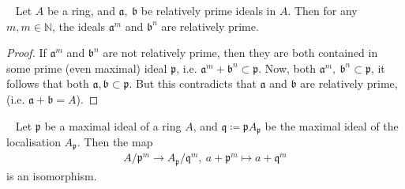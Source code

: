 \documentclass[12pt,a4paper,footinclude=true,headinclude=true]{scrbook} %
\newenvironment{lemma}[2][]
{\renewcommand\theinnercustomlemma{#2}\innercustomlemma[#1]
\begin{mdframed}[backgroundcolor=gray!20]\ }
{\end{mdframed}\endinnercustomprop}
\begin{document}
\begin{lemma}{127}
    Let $A$ be a ring, and $\mathfrak{a},\ \mathfrak{b}$ be relatively prime ideals in $A$. Then for any $m,m\in\mathbb{N}$, the ideals $\mathfrak{a}^m$ and $\mathfrak{b}^n$ are relatively prime.
\end{lemma}
\begin{proof}
    If $\mathfrak{a}^m$ and $\mathfrak{b}^n$ are not relatively prime, then they are both contained in some prime (even maximal) ideal $\mathfrak{p}$, i.e. $\mathfrak{a}^m+\mathfrak{b}^n\subset
    \mathfrak{p}$. Now, both $\mathfrak{a}^m,\ \mathfrak{b}^n\subset
    \mathfrak{p}$, it follows that both $\mathfrak{a}, \mathfrak{b} \subset\mathfrak{p}$. But this contradicts that $\mathfrak{a}$ and $\mathfrak{b}$ are relatively prime, (i.e. $\mathfrak{a}+ \mathfrak{b} =A$).
\end{proof}
\newpage
\begin{lemma}{128}
    Let $\mathfrak{p}$ be a maximal ideal of a ring $A$, and $\mathfrak{q}\coloneqq \mathfrak{p}A_\mathfrak{p}$ be the maximal ideal of the localisation $A_\mathfrak{p}$. Then the map 
    \begin{align*}
        A/\mathfrak{p}^m\longrightarrow A_\mathfrak{p}/\mathfrak{q}^m,\ a+\mathfrak{p}^m\longmapsto a+\mathfrak{q}^m
    \end{align*}
    is an isomorphism.
\end{lemma}
\end{document}
